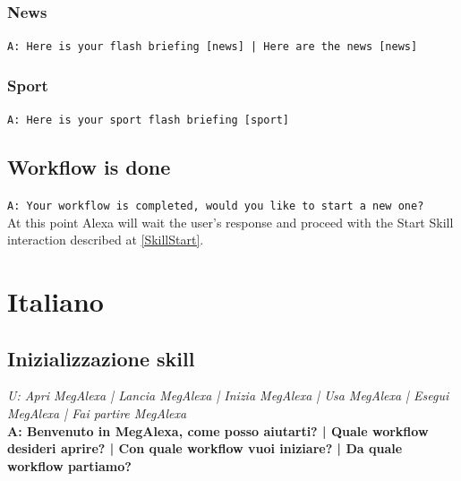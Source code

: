 \subsubsection{News}
\texttt{A: Here is your flash briefing [news] | Here are the news [news]}

\subsubsection{Sport}
\texttt{A: Here is your sport flash briefing [sport]}

\subsection{Workflow is done}
\texttt{A: Your workflow is completed, would you like to start a new one?}\\
At this point Alexa will wait the user's response and proceed with the Start Skill interaction described at \ref{SkillStart}.

\section{Italiano}
\subsection{Inizializzazione skill} \label{InizializzazioneSkill}
\textit{U: Apri MegAlexa | Lancia MegAlexa | Inizia MegAlexa | Usa MegAlexa | Esegui MegAlexa | Fai partire MegAlexa}\\
\textbf{A: Benvenuto in MegAlexa, come posso aiutarti? | Quale workflow desideri aprire? | Con quale workflow vuoi iniziare? | Da quale workflow partiamo?}

